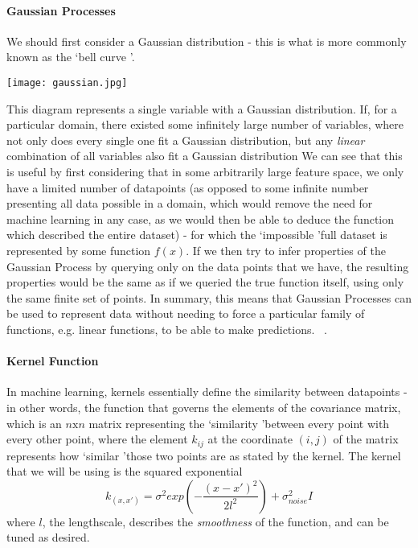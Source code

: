 \documentclass[10pt,sts]{article}
\begin{document}
\begin{multicols}{2}
    \paragraph{Gaussian Processes}

    We should first consider a Gaussian distribution - this is what is more commonly known as the \lq bell curve \rq. 

    \texttt{[image: gaussian.jpg]}

    This diagram represents a single variable with a Gaussian distribution. If, for a particular domain, there existed some infinitely large number of variables, where not only does every single one fit a Gaussian distribution, but any \textit{linear} combination of all variables also fit a Gaussian distribution We can see that this is useful by first considering that in some arbitrarily large feature space, we only have a limited number of datapoints (as opposed to some infinite number presenting all data possible in a domain, which would remove the need for machine learning in any case, as we would then be able to deduce the function which described the entire dataset) - for which the \lq impossible \rq full dataset is represented by some function $f(x)$. If we then try to infer properties of the Gaussian Process by querying only on the data points that we have, the resulting properties would be the same as if we queried the true function itself, using only the same finite set of points. In summary, this means that Gaussian Processes can be used to represent data without needing to force a particular family of functions, e.g. linear functions, to be able to make predictions. ~\citep{rasmussen06}.

    \paragraph{Kernel Function} In machine learning, kernels essentially define the similarity between datapoints - in other words, the function that governs the elements of the covariance matrix, which is an $n \textrm{x} n$ matrix representing the \lq similarity \rq between every point with every other point, where the element $k_{ij}$ at the coordinate $(i,j)$ of the matrix represents how \lq similar \rq those two points are as stated by the kernel. The kernel that we will be using is the squared exponential $$ k_{(x, x')} = \sigma^2 exp\left(-\frac{(x-x')^2}{2l^2}\right) + \sigma^2_{noise}I$$ where $l$, the lengthscale, describes the \textit{smoothness} of the function, and can be tuned as desired.


\end{multicols}
\end{document}
